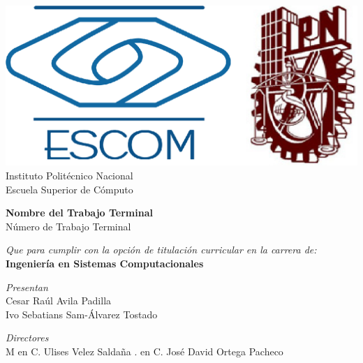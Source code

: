 
\begin{titlepage}

    \centering %

    \includegraphics[scale=0.17]{imagenes/escom-ipn} %
    \LARGE{\\ Instituto Polit\'ecnico Nacional}
    \LARGE{\\ Escuela Superior de C\'omputo}
    
    \vspace{1cm} %

    \LARGE \textbf{ Nombre del Trabajo Terminal}
    \LARGE {\\ Número de Trabajo Terminal}

    \vspace{1cm} %

    \LARGE \textit{Que para cumplir con la opción de titulación curricular en la carrera de:}
    \LARGE \textbf{\\ Ingeniería en Sistemas Computacionales}

    \vspace{1cm} %

   \textit{Presentan}\\
    Cesar Raúl Avila Padilla \\
    Ivo Sebatians Sam-Álvarez Tostado\\

    \vspace{1cm} %

   \textit{Directores}\\
   M en C. Ulises Velez Saldaña  \bigskipM. en C. José David Ortega Pacheco 
   

\end{titlepage}
